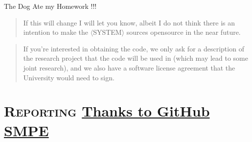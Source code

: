 \documentclass[xcolor=x11names,compress,8pt]{beamer}
\renewcommand{\(}{\begin{columns}}
\renewcommand{\)}{\end{columns}}
\newcommand{\<}[1]{\begin{column}{#1}}
\renewcommand{\>}{\end{column}}
\begin{document}
\begin{frame}[label=sec-1-0-4]{The Dog Ate my Homework !!! }
\begin{block}{}
\begin{overlayarea}{\linewidth}{5cm}
{\begin{quote}
          If this will change I will let you know, albeit I do not
          think there is an intention to make the
          $\langle$SYSTEM$\rangle$ sources opensource in the near
          future.
        \end{quote}
        \begin{quote}
          If you're interested in obtaining the code, \alert{we only ask
            for a description of the research project} that the code
          will be used in (\alert{which may lead to some joint
            research}), and we also have a software license agreement
          that the University would need to sign.
        \end{quote}}
    \end{overlayarea}
  \end{block}
  \null\vspace{-.4cm}
\end{frame}
\section[{\scshape Reporting}]{{\scshape Reporting} \href{https://github.com/alegrand/SMPE}{Thanks to GitHub SMPE} }
 
\label{sec-3}
\end{document}
